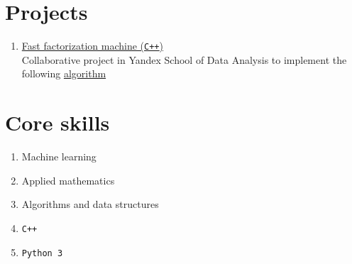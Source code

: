 \documentclass[twocolumn,10pt]{extarticle}
\begin{document}
\section{Projects}

\begin{enumerate}
\item \href{https://gitlab.com/Byobe/fast-fm-shad-2019}{Fast factorization machine (\texttt{C++})} \\
  \quad Collaborative project in Yandex School of Data Analysis to implement the following \href{https://www.csie.ntu.edu.tw/~b97053/paper/Rendle2010FM.pdf}{algorithm}
\end{enumerate}

\section{Core skills}

\begin{enumerate}
  \item Machine learning
  \item Applied mathematics
  \item Algorithms and data structures
  \item \texttt{C++}
  \item \texttt{Python 3}
\end{enumerate}
\end{document}
